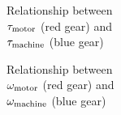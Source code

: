 \documentclass[12pt]{article}
\begin{document}
\begin{landscape}
\null

\vspace{0.5in}


\hspace{1in}\begin{minipage}{0.5\textheight}
	\begin{center}
		\large
		Relationship between \\ $\tau_{\rm{motor}}$ (red gear) and \\$\tau_{\rm{machine}}$ (blue gear)
		
		
		\vspace{1.5in}
		
		\underline{\hspace{3in}}
		
	\end{center}
\end{minipage}
\begin{minipage}{0.5\textheight}
	\begin{center}
		\large
		Relationship between \\ $\omega_{\rm{motor}}$ (red gear) and \\$\omega_{\rm{machine}}$ (blue gear)
		
		\vspace{1.5in}
		
		\underline{\hspace{3in}}
		
	\end{center}
\end{minipage}
\end{landscape}

\vspace{2in}
\end{document}
